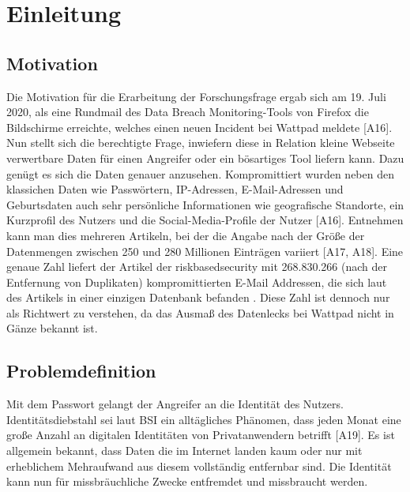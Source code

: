 \chapter{Einleitung}

\section{Motivation}
Die Motivation für die Erarbeitung der Forschungsfrage ergab sich am 19. Juli 2020, als eine Rundmail des Data Breach Monitoring-Tools von Firefox die Bildschirme erreichte, welches einen neuen Incident bei Wattpad meldete [A16]. Nun stellt sich die berechtigte Frage, inwiefern diese in Relation kleine Webseite verwertbare Daten für einen Angreifer oder ein bösartiges Tool liefern kann. Dazu genügt es sich die Daten genauer anzusehen. Kompromittiert wurden neben den klassichen Daten wie Passwörtern, IP-Adressen, E-Mail-Adressen und Geburtsdaten auch sehr persönliche Informationen wie geografische Standorte, ein Kurzprofil des Nutzers und die Social-Media-Profile der Nutzer [A16]. Entnehmen kann man dies mehreren Artikeln, bei der die Angabe nach der Größe der Datenmengen zwischen 250 und 280 Millionen Einträgen variiert [A17, A18]. Eine genaue Zahl liefert der Artikel der riskbasedsecurity mit 268.830.266 (nach der Entfernung von Duplikaten) kompromittierten E-Mail Addressen, die sich laut des Artikels in einer einzigen Datenbank befanden \cite{A6}. Diese Zahl ist dennoch nur als Richtwert zu verstehen, da das Ausmaß des Datenlecks bei Wattpad nicht in Gänze bekannt ist.

\section{Problemdefinition}
Mit dem Passwort gelangt der Angreifer an die Identität des Nutzers.  Identitätsdiebstahl sei laut BSI ein alltägliches Phänomen, dass jeden Monat eine große Anzahl an digitalen Identitäten von Privatanwendern betrifft [A19]. Es ist allgemein bekannt, dass Daten die im Internet landen kaum oder nur mit erheblichem Mehraufwand aus diesem vollständig entfernbar sind. Die Identität kann nun für missbräuchliche Zwecke entfremdet und missbraucht werden.
\newpage

